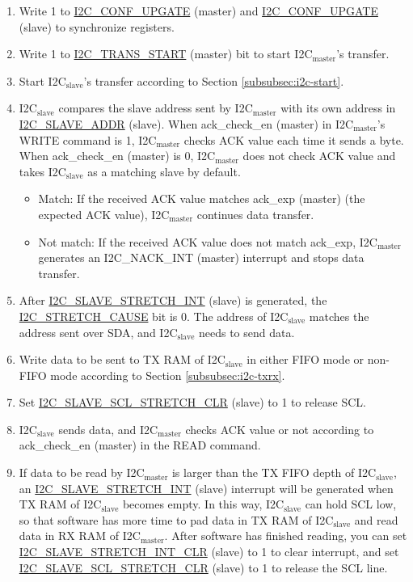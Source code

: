 \documentclass[main\_\_EN.tex]{subfiles}
\begin{document}
\begin{enumerate}
\item Write 1 to \hyperref[fielddesc:I2CCONFUPGATE]{I2C\_CONF\_UPGATE} (master) and \hyperref[fielddesc:I2CCONFUPGATE]{I2C\_CONF\_UPGATE} (slave) to synchronize registers.
\item Write 1 to \hyperref[fielddesc:I2CTRANSSTART]{I2C\_TRANS\_START} (master) bit to start I2C$_\text{master}$'s transfer.
\item Start I2C$_\text{slave}$'s transfer according to Section \ref{subsubsec:i2c-start}.
\item I2C$_\text{slave}$ compares the slave address sent by I2C$_\text{master}$ with its own address in \hyperref[fielddesc:I2CSLAVEADDR]{I2C\_SLAVE\_ADDR} (slave). When ack\_check\_en (master) in I2C$_\text{master}$'s WRITE command is 1, I2C$_\text{master}$ checks ACK value each time it sends a byte. When ack\_check\_en (master) is 0, I2C$_\text{master}$ does not check ACK value and takes I2C$_\text{slave}$ as a matching slave by default.
\begin{itemize}
\item Match: If the received ACK value matches ack\_exp (master) (the expected ACK value), I2C$_\text{master}$ continues data transfer.
\item Not match: If the received ACK value does not match ack\_exp, I2C$_\text{master}$ generates an I2C\_NACK\_INT (master) interrupt and stops data transfer.
\end{itemize}

\item After \hyperref[int:i2c-slave-stretch]{I2C\_SLAVE\_STRETCH\_INT} (slave) is generated, the \hyperref[fielddesc:I2CSTRETCHCAUSE]{I2C\_STRETCH\_CAUSE} bit is 0. The address of I2C$_\text{slave}$ matches the address sent over SDA, and I2C$_\text{slave}$ needs to send data.
\item Write data to be sent to TX RAM of I2C$_\text{slave}$ in either FIFO mode or non-FIFO mode according to Section \ref{subsubsec:i2c-txrx}.
\item Set \hyperref[fielddesc:I2CSLAVESCLSTRETCHCLR]{I2C\_SLAVE\_SCL\_STRETCH\_CLR} (slave) to 1 to release SCL.

\item I2C$_\text{slave}$ sends data, and I2C$_\text{master}$ checks ACK value or not according to ack\_check\_en (master) in the READ command.

\item If data to be read by I2C$_\text{master}$ is larger than the TX FIFO depth of I2C$_\text{slave}$, an \hyperref[int:i2c-slave-stretch]{I2C\_SLAVE\_STRETCH\_INT} (slave) interrupt will be generated when TX RAM of I2C$_\text{slave}$ becomes empty. In this way, I2C$_\text{slave}$ can hold SCL low, so that software has more time to pad data in TX RAM of I2C$_\text{slave}$ and read data in RX RAM of I2C$_\text{master}$. After software has finished reading, you can set \hyperref[fielddesc:I2CSLAVESTRETCHINTCLR]{I2C\_SLAVE\_STRETCH\_INT\_CLR} (slave) to 1 to clear interrupt, and set \hyperref[fielddesc:I2CSLAVESCLSTRETCHCLR]{I2C\_SLAVE\_SCL\_STRETCH\_CLR} (slave) to 1 to release the SCL line.


\end{enumerate}
\end{document}
